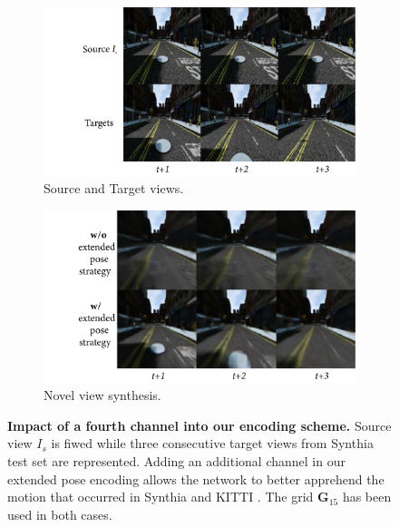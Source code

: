\begin{figure}[htp!]
    \centering
    \begin{subfigure}[b]{0.48\linewidth}
      \includegraphics[width=\linewidth]{images/epipolarnvs/ablationSynthia_New.png}
      \caption{Source and Target views.}
    \end{subfigure}
    \quad %
    \begin{subfigure}[b]{0.48\linewidth}
      \includegraphics[width=\linewidth]{images/epipolarnvs/ablationSynthia2_New.png}
      \caption{Novel view synthesis.}
    \end{subfigure}
    \caption{\textbf{Impact of a fourth channel into our encoding scheme.} Source view $I_s$ is fiwed while three consecutive target views from Synthia \cite{ros2016synthia} test set are represented. Adding an additional channel in our extended pose encoding allows the network to better apprehend the motion that occurred in Synthia \cite{ros2016synthia} and KITTI \cite{geiger2012we}. The grid $\textbf{G}_{15}$ has been used in both cases.}
    \label{fig:ablaSynthia}
  \end{figure}

